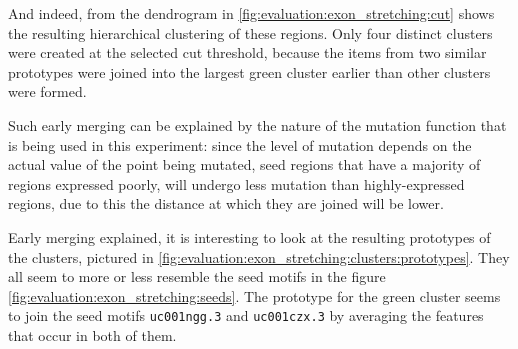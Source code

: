 \documentclass[parskip]{cs4rep}
\newcommand{\gene}[1]{{\tt #1}}
\begin{document}
And indeed, from the dendrogram in \autoref{fig:evaluation:exon_stretching:cut} shows the resulting hierarchical clustering of these regions. Only four distinct clusters were created at the selected cut threshold, because the items from two similar prototypes were joined into the largest green cluster earlier than other clusters were formed. 

Such early merging can be explained by the nature of the mutation function that is being used in this experiment: since the level of mutation depends on the actual value of the point being mutated, seed regions that have a majority of regions expressed poorly, will undergo less mutation than highly-expressed regions, due to this the distance at which they are joined will be lower.

Early merging explained, it is interesting to look at the resulting prototypes of the clusters, pictured in  \autoref{fig:evaluation:exon_stretching:clusters:prototypes}. They all seem to more or less resemble the seed motifs in the figure \autoref{fig:evaluation:exon_stretching:seeds}. The prototype for the green cluster seems to join the seed motifs \gene{uc001ngg.3} and \gene{uc001czx.3}  by averaging the features that occur in both of them.
\end{document}
